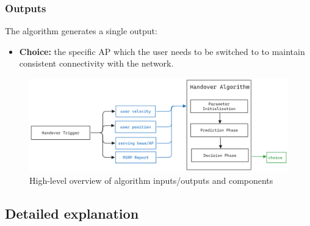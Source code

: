 \subsubsection{Outputs}
The algorithm generates a single output:
\begin{itemize}
    \item \textbf{Choice:} the specific AP which the user needs to be switched to to maintain consistent connectivity with the network.
\end{itemize}

\begin{figure}
    \centering
    \includegraphics[width=1\linewidth]{Figures/algo-overview.png}
    \caption{High-level overview of algorithm inputs/outputs and components}
    \label{fig:algo-overview}
\end{figure}

\label{subsec:algo_overview}
\subsection{Detailed explanation}
\label{subsec:algo_exp}
